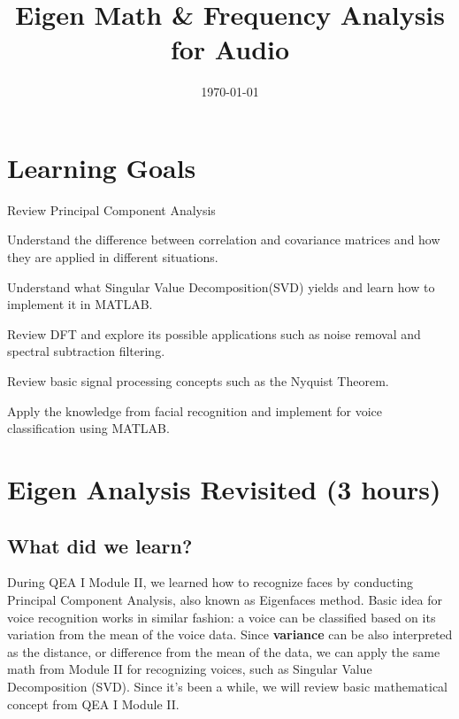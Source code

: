 \documentclass{tufte-handout}
\title{Eigen Math \& Frequency Analysis for Audio}
\author{}
\date{\today}
\begin{document}
\maketitle

\vspace{0.1in}

\section{Learning Goals}

\begin{description}[font=$\bullet$\scshape\bfseries]

\item[]Review Principal Component Analysis

\item[]Understand the difference between correlation and covariance matrices and how they are applied in different situations. 

\item[]Understand what Singular Value Decomposition(SVD) yields and learn how to implement it in MATLAB.

\item[]Review DFT and explore its possible applications such as noise removal and spectral subtraction filtering.

\item[]Review basic signal processing concepts such as the Nyquist Theorem.

\item[]Apply the knowledge from facial recognition and implement for voice classification using MATLAB.

\end{description}



\section{Eigen Analysis Revisited (3 hours)}

\subsection{What did we learn?}
During QEA I Module II, we learned how to recognize faces by conducting Principal Component Analysis, also known as Eigenfaces method. Basic idea for voice recognition works in similar fashion: a voice can be classified based on its variation from the mean of the voice data. Since \textbf{variance} can be also interpreted as the distance, or difference from the mean of the data, we can apply the same math from Module II for recognizing voices, such as Singular Value Decomposition (SVD). Since it's been a while, we will review basic mathematical concept from QEA I Module II. 
\end{document}
